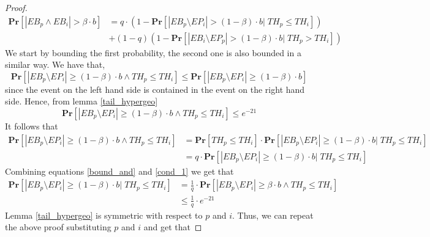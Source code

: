 \begin{proof}
\begin{equation}\begin{split}\label{lala}
\textbf{Pr}[|EB_p\wedge  EB_i|>\beta \cdot b ]&=q\cdot (1- \textbf{Pr}[|  EB_p\setminus EP_i|>(1-\beta) \cdot b |\; TH_p\leq TH_i])\\&+(1-q)(1-\textbf{Pr}[|EB_i\setminus EP_p|>(1-\beta) \cdot b |\; TH_p>TH_i])
\end{split}\end{equation}
We start by bounding the first probability, the second one is also bounded in a similar way. We have that,
\begin{equation}\label{additive}
\textbf{Pr}[|EB_p\setminus EP_i|\geq(1- \beta) \cdot b\wedge TH_p\leq TH_i]\leq \textbf{Pr}[|EB_p\setminus EP_i|\geq (1-\beta) \cdot b]
\end{equation}
since the event on the left hand side is contained in the event on the right hand side. Hence, from lemma \ref{tail_hypergeo}
\begin{equation}\label{bound_and}
\textbf{Pr}[|EB_p\setminus EP_i|\geq (1-\beta) \cdot b\wedge TH_p\leq TH_i]\leq e^{-21}
\end{equation}
It follows that
\begin{equation}\begin{split}\label{cond_1}
\textbf{Pr}[|EB_p\setminus EP_i|\geq (1-\beta) \cdot b\wedge TH_p\leq TH_i]&=\textbf{Pr}[TH_p\leq TH_i]\cdot \textbf{Pr}[|EB_p\setminus EP_i|\geq (1-\beta) \cdot b |\; TH_p\leq TH_i] \\
&=q\cdot \textbf{Pr}[|EB_p\setminus EP_i|\geq (1-\beta) \cdot b|\; TH_p\leq TH_i]
\end{split}\end{equation}
Combining equations \ref{bound_and} and \ref{cond_1} we get that 
\begin{equation}\label{pminusi}\begin{split}
 \textbf{Pr}[|EB_p\setminus EP_i|\geq(1- \beta) \cdot b|\; TH_p\leq TH_i]&=\frac{1}{q}\cdot \textbf{Pr}[|EB_p\setminus EP_i|\geq \beta \cdot b\wedge TH_p\leq TH_i]\\
&\leq \frac{1}{q}\cdot e^{-21}
\end{split}\end{equation}
Lemma \ref{tail_hypergeo} is symmetric with respect to $p$ and $i$. Thus, we can repeat the above proof substituting $p$ and $i$ and get that

\end{proof}
